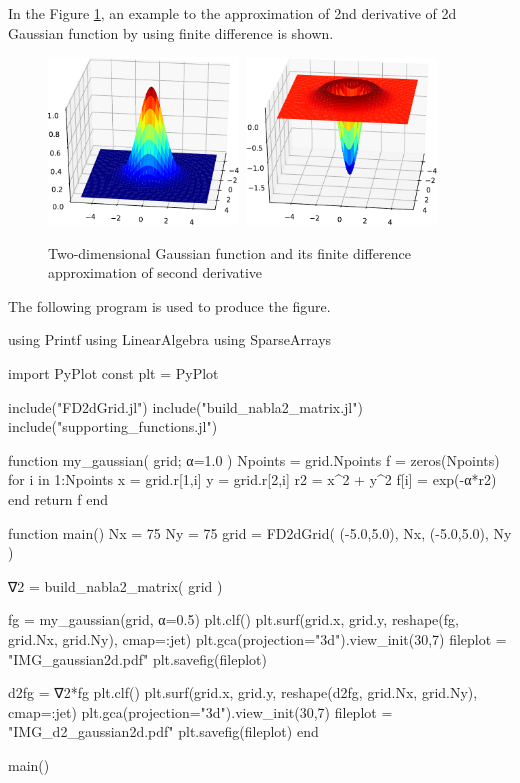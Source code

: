 In the Figure \ref{fig:fd_gaussian_2d}, an example to the approximation of 2nd derivative
of 2d Gaussian function by using finite difference is shown.

\begin{figure}[H]
{\center
\includegraphics[width=0.45\textwidth]{../codes/FD2d/IMG_gaussian2d.pdf}\,%
\includegraphics[width=0.45\textwidth]{../codes/FD2d/IMG_d2_gaussian2d.pdf}
\par}
\caption{Two-dimensional Gaussian function and its finite difference
approximation of second derivative}
\label{fig:fd_gaussian_2d}
\end{figure}

The following program is used to produce the figure.
\begin{juliacode}
using Printf
using LinearAlgebra
using SparseArrays
    
import PyPlot
const plt = PyPlot
    
include("FD2dGrid.jl")
include("build_nabla2_matrix.jl")
include("supporting_functions.jl")
    
function my_gaussian( grid; α=1.0 )
  Npoints = grid.Npoints
  f = zeros(Npoints)
  for i in 1:Npoints
    x = grid.r[1,i]
    y = grid.r[2,i]
    r2 = x^2 + y^2
    f[i] = exp(-α*r2)
  end
  return f
end
    
function main()  
  Nx = 75
  Ny = 75
  grid = FD2dGrid( (-5.0,5.0), Nx, (-5.0,5.0), Ny )
    
  ∇2 = build_nabla2_matrix( grid )
    
  fg = my_gaussian(grid, α=0.5)
  plt.clf()
  plt.surf(grid.x, grid.y, reshape(fg, grid.Nx, grid.Ny), cmap=:jet)
  plt.gca(projection="3d").view_init(30,7)
  fileplot = "IMG_gaussian2d.pdf"
  plt.savefig(fileplot)
    
  d2fg = ∇2*fg    
  plt.clf()
  plt.surf(grid.x, grid.y, reshape(d2fg, grid.Nx, grid.Ny), cmap=:jet)
  plt.gca(projection="3d").view_init(30,7)    
  fileplot = "IMG_d2_gaussian2d.pdf"
  plt.savefig(fileplot)
end
    
main()    
\end{juliacode}


